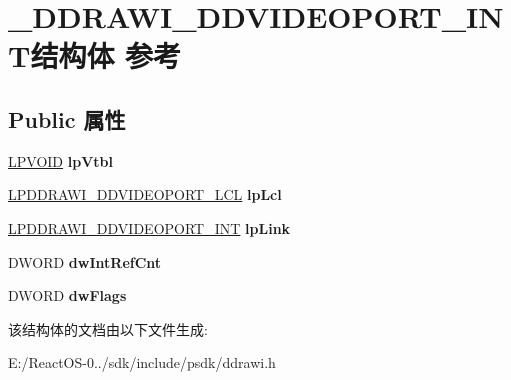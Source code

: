 \hypertarget{struct___d_d_r_a_w_i___d_d_v_i_d_e_o_p_o_r_t___i_n_t}{}\section{\+\_\+\+D\+D\+R\+A\+W\+I\+\_\+\+D\+D\+V\+I\+D\+E\+O\+P\+O\+R\+T\+\_\+\+I\+N\+T结构体 参考}
\label{struct___d_d_r_a_w_i___d_d_v_i_d_e_o_p_o_r_t___i_n_t}
\subsection*{Public 属性}
\begin{DoxyCompactItemize}
\item 
\mbox{\label{struct___d_d_r_a_w_i___d_d_v_i_d_e_o_p_o_r_t___i_n_t_aeabfc6fcd35cd77221e98c764549dd48}} 
\hyperlink{interfacevoid}{L\+P\+V\+O\+ID} {\bfseries lp\+Vtbl}
\item 
\mbox{\label{struct___d_d_r_a_w_i___d_d_v_i_d_e_o_p_o_r_t___i_n_t_aec8b9a126a0598f6c239b458a3202357}} 
\hyperlink{struct___d_d_r_a_w_i___d_d_v_i_d_e_o_p_o_r_t___l_c_l}{L\+P\+D\+D\+R\+A\+W\+I\+\_\+\+D\+D\+V\+I\+D\+E\+O\+P\+O\+R\+T\+\_\+\+L\+CL} {\bfseries lp\+Lcl}
\item 
\mbox{\label{struct___d_d_r_a_w_i___d_d_v_i_d_e_o_p_o_r_t___i_n_t_a8b37e7b46e5ccecdc87bffa9dffe8596}} 
\hyperlink{struct___d_d_r_a_w_i___d_d_v_i_d_e_o_p_o_r_t___i_n_t}{L\+P\+D\+D\+R\+A\+W\+I\+\_\+\+D\+D\+V\+I\+D\+E\+O\+P\+O\+R\+T\+\_\+\+I\+NT} {\bfseries lp\+Link}
\item 
\mbox{\label{struct___d_d_r_a_w_i___d_d_v_i_d_e_o_p_o_r_t___i_n_t_a558dfc259f275b99413bb5d86c858c7b}} 
D\+W\+O\+RD {\bfseries dw\+Int\+Ref\+Cnt}
\item 
\mbox{\label{struct___d_d_r_a_w_i___d_d_v_i_d_e_o_p_o_r_t___i_n_t_a7d1e435edb95bdf37a832d24e030c6ff}} 
D\+W\+O\+RD {\bfseries dw\+Flags}
\end{DoxyCompactItemize}


该结构体的文档由以下文件生成\+:\begin{DoxyCompactItemize}
\item 
E\+:/\+React\+O\+S-\/0../sdk/include/psdk/ddrawi.\+h\end{DoxyCompactItemize}
